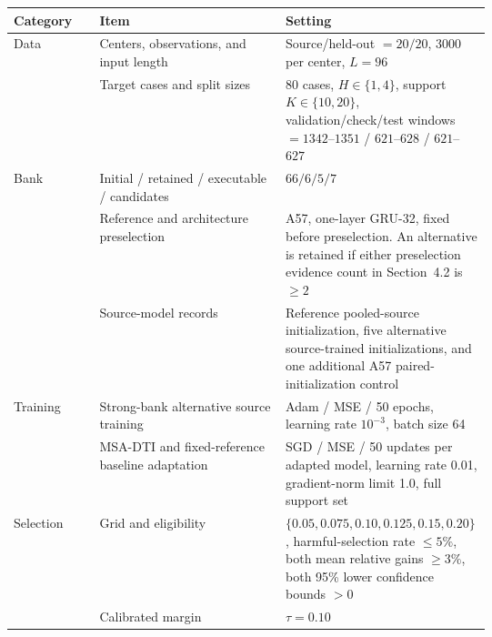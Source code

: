 \begin{center}
\begin{minipage}{\linewidth}
\label{tab:configuration}
\centering
\scriptsize
\renewcommand{\arraystretch}{1.05}
\setlength{\tabcolsep}{2.5pt}

\begin{tabularx}{\linewidth}{Z{0.18\linewidth} Y Z{0.43\linewidth}}
\toprule
Category & Item & Setting \\
\midrule

Data
& Centers, observations, and input length
& Source/held-out $=20/20$, 3000 per center, $L=96$ \\

& Target cases and split sizes
& 80 cases, $H\in\{1,4\}$, support $K\in\{10,20\}$,
validation/check/test windows
$=1342$--$1351$ / $621$--$628$ / $621$--$627$ \\

\midrule

Bank
& Initial / retained / executable / candidates
& $66/6/5/7$ \\

& Reference and architecture preselection
& A57, one-layer GRU-32, fixed before preselection. An alternative is retained if
either preselection evidence count in Section~4.2 is $\geq 2$ \\

& Source-model records
& Reference pooled-source initialization, five alternative source-trained
initializations, and one additional A57 paired-initialization control \\

\midrule

Training
& Strong-bank alternative source training
& Adam / MSE / 50 epochs, learning rate $10^{-3}$, batch size 64 \\

& MSA-DTI and fixed-reference baseline adaptation
& SGD / MSE / 50 updates per adapted model, learning rate 0.01,
gradient-norm limit 1.0, full support set \\

\midrule

Selection
& Grid and eligibility
& $\{0.05, 0.075, 0.10, 0.125, 0.15, 0.20\}$,
harmful-selection rate $\leq 5\%$, both mean relative gains $\geq 3\%$,
both 95\% lower confidence bounds $>0$ \\

& Calibrated margin
& $\tau=0.10$ \\


\end{tabularx}
\end{minipage}
\end{center}
